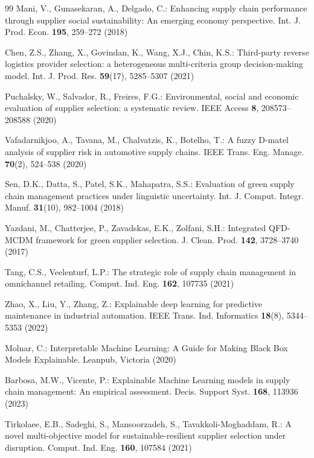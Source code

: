 \documentclass[twocolumn,10pt]{article}
\begin{document}
\begin{thebibliography}{99}
Mani, V., Gunasekaran, A., Delgado, C.: Enhancing supply chain performance through supplier social sustainability: An emerging economy perspective. Int. J. Prod. Econ. \textbf{195}, 259--272 (2018)

Chen, Z.S., Zhang, X., Govindan, K., Wang, X.J., Chin, K.S.: Third-party reverse logistics provider selection: a heterogeneous multi-criteria group decision-making model. Int. J. Prod. Res. \textbf{59}(17), 5285--5307 (2021)

Puchalsky, W., Salvador, R., Freires, F.G.: Environmental, social and economic evaluation of supplier selection: a systematic review. IEEE Access \textbf{8}, 208573--208588 (2020)

Vafadarnikjoo, A., Tavana, M., Chalvatzis, K., Botelho, T.: A fuzzy D-matel analysis of supplier risk in automotive supply chains. IEEE Trans. Eng. Manage. \textbf{70}(2), 524--538 (2020)

Sen, D.K., Datta, S., Patel, S.K., Mahapatra, S.S.: Evaluation of green supply chain management practices under linguistic uncertainty. Int. J. Comput. Integr. Manuf. \textbf{31}(10), 982--1004 (2018)

Yazdani, M., Chatterjee, P., Zavadskas, E.K., Zolfani, S.H.: Integrated QFD-MCDM framework for green supplier selection. J. Clean. Prod. \textbf{142}, 3728--3740 (2017)

Tang, C.S., Veelenturf, L.P.: The strategic role of supply chain management in omnichannel retailing. Comput. Ind. Eng. \textbf{162}, 107735 (2021)

Zhao, X., Liu, Y., Zhang, Z.: Explainable deep learning for predictive maintenance in industrial automation. IEEE Trans. Ind. Informatics \textbf{18}(8), 5344--5353 (2022)

Molnar, C.: Interpretable Machine Learning: A Guide for Making Black Box Models Explainable. Leanpub, Victoria (2020)

Barbosa, M.W., Vicente, P.: Explainable Machine Learning models in supply chain management: An empirical assessment. Decis. Support Syst. \textbf{168}, 113936 (2023)

Tirkolaee, E.B., Sadeghi, S., Mansoorzadeh, S., Tavakkoli-Moghaddam, R.: A novel multi-objective model for sustainable-resilient supplier selection under disruption. Comput. Ind. Eng. \textbf{160}, 107584 (2021)


\end{thebibliography}
\end{document}
